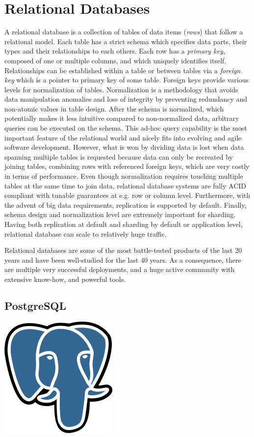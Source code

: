 \section{Relational Databases} 

A relational database is a collection of tables of data items (\textit{rows}) that follow a relational model. Each table has a strict schema which specifies data parts, their types and their relationships to each others. Each row has a \textit{primary key}, composed of one or multiple columns, and which uniquely identifies itself. Relationships can be established within a table or between tables via a \textit{foreign key} which is a pointer to primary key of some table. Foreign keys provide various levels for normalization of tables. Normalization is a methodology that avoids data manipulation anomalies and loss of integrity by preventing redundancy and non-atomic values in table design. After the schema is normalized, which potentially makes it less intuitive compared to non-normalized data, arbitrary queries can be executed on the schema. This ad-hoc query capability is the most important feature of the relational world and nicely fits into evolving and agile software development. However, what is won by dividing data is lost when data spanning multiple tables is requested because data can only be recreated by joining tables, combining rows with referenced foreign keys, which are very costly in terms of performance. Even though normalization requires touching multiple tables at the same time to join data, relational database systems are fully ACID compliant with tunable guarantees at  e.g. row or column level. Furthermore, with the advent of big data requirements, replication is supported by default. Finally, schema design and normalization level are extremely important for sharding. Having both replication at default and sharding by default or application level, relational database can scale to relatively huge traffic.

Relational databases are some of the most battle-tested products of the last 20 years and have been well-studied for the last 40 years. As a consequence, there are multiple very successful deployments, and a huge active community with extensive know-how, and powerful tools.

\subsection{PostgreSQL}

\vspace{-1.15cm} \hspace{4.1cm} \includegraphics[scale=0.2]{3/figures/postgresql.png}

